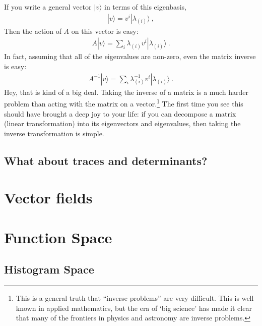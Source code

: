 \documentclass[
  11pt,
	colorful,
	raggedright,
]{tufte-style-thesis-flip}
\begin{document}
If you write a general vector $|v\rangle$ in terms of this eigenbasis,
\begin{align}
  |v\rangle = v^i |\lambda_{(i)} \rangle \ ,
\end{align}
Then the action of $A$ on this vector is easy:
\begin{align}
  A |v\rangle = \sum_i \lambda_{(i)} v^i |\lambda_{(i)} \rangle \ .
\end{align}
In fact, assuming that all of the eigenvalues are non-zero, even the matrix inverse is easy:
\begin{align}
  A^{-1}|v\rangle = \sum_i \lambda_{(i)}^{-1} v^i |\lambda_{(i)} \rangle \ .
  \label{eq:linear:aglebra:inverse:eigenvectors}
\end{align}
Hey, that is kind of a big deal. Taking the inverse of a matrix is a much harder problem than acting with the matrix on a vector.\footnote{This is a general truth that ``inverse problems'' are very difficult. This is well known in applied mathematics, but the era of `big science' has made it clear that many of the frontiers in physics and astronomy are inverse problems.}
The first time you see this should have brought a deep joy to your life: if you can decompose a matrix (linear transformation) into its eigenvectors and eigenvalues, then taking the inverse transformation is simple.





\section{What about traces and determinants?}



\chapter{Vector fields}
\label{chap:vector:fields}

\chapter{Function Space}

\section{Histogram Space}
\label{sec:histogramspace}
\end{document}
